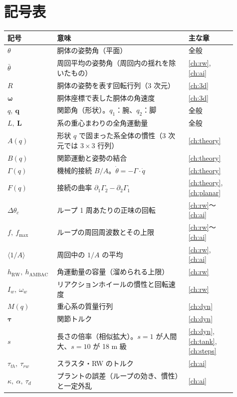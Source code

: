\chapter*{記号表}

\begin{longtable}{p{0.16\linewidth}p{0.55\linewidth}p{0.20\linewidth}}
\toprule
記号 & 意味 & 主な章 \\ \midrule \endhead
$\theta$ & 胴体の姿勢角（平面） & 全般 \\
$\bar\theta$ & 周回平均の姿勢角（周回内の揺れを除いたもの） & \ref{ch:rw}, \ref{ch:ai} \\
$R$ & 胴体の姿勢を表す回転行列（3 次元） & \ref{ch:3d} \\
$\bm\omega$ & 胴体座標で表した胴体の角速度 & \ref{ch:3d} \\
$q,\ \bm q$ & 関節角（形状）。$q_1$：腕、$q_2$：脚 & 全般 \\
$L,\ \bm L$ & 系の重心まわりの全角運動量 & 全般 \\
$A(q)$ & 形状 $q$ で固まった系全体の慣性（3 次元では $3\times3$ 行列） & \ref{ch:theory} \\
$B(q)$ & 関節運動と姿勢の結合 & \ref{ch:theory} \\
$\Gamma(q)$ & 機械的接続 $B/A$。$\dot\theta=-\Gamma\cdot\dot q$ & \ref{ch:theory} \\
$F(q)$ & 接続の曲率 $\partial_1\Gamma_2-\partial_2\Gamma_1$ & \ref{ch:theory}, \ref{ch:planar} \\
$\Delta\theta_c$ & ループ 1 周あたりの正味の回転 & \ref{ch:rw}〜\ref{ch:ai} \\
$f,\ f_{\max}$ & ループの周回周波数とその上限 & \ref{ch:rw}〜\ref{ch:ai} \\
$\langle1/A\rangle$ & 周回中の $1/A$ の平均 & \ref{ch:rw}, \ref{ch:ai} \\
$h_{\mathrm{RW}},\ h_{\mathrm{AMBAC}}$ & 角運動量の容量（溜められる上限） & \ref{ch:rw} \\
$I_w,\ \omega_w$ & リアクションホイールの慣性と回転速度 & \ref{ch:rw} \\
$M(q)$ & 重心系の質量行列 & \ref{ch:dyn} \\
$\bm\tau$ & 関節トルク & \ref{ch:dyn} \\
$s$ & 長さの倍率（相似拡大）。$s=1$ が人間大、$s=10$ が 18 m 級 & \ref{ch:dyn}, \ref{ch:tank}, \ref{ch:steps} \\
$\tau_{th},\ \tau_{rw}$ & スラスタ・RW のトルク & \ref{ch:ai} \\
$\kappa,\ \alpha,\ \tau_d$ & プラントの誤差（ループの効き、慣性）と一定外乱 & \ref{ch:ai} \\

\end{longtable}
